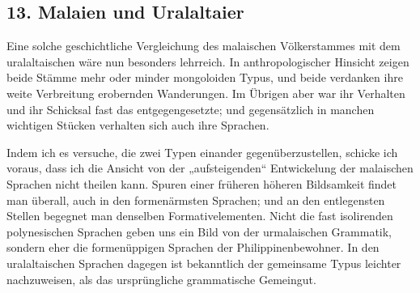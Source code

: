 \subsection*{13. Malaien und {\color{lsLightWine}Uralaltaier}}\label{IV.IV.13}


Eine solche geschichtliche Vergleichung des malaischen Völkerstammes mit dem uralaltaischen wäre nun besonders lehrreich. In anthropologischer Hinsicht zeigen beide Stämme mehr oder minder mongoloiden Typus, und beide verdanken ihre weite Verbreitung erobernden Wanderungen. Im Übrigen aber war ihr Verhalten und ihr Schicksal fast das entgegengesetzte; und gegensätzlich in manchen wichtigen Stücken verhalten sich auch ihre Sprachen.

Indem ich es versuche, die zwei Typen einander gegenüberzustellen, schicke ich voraus, dass ich die Ansicht von der „aufsteigenden“ Entwickelung der malaischen Sprachen nicht theilen kann. Spuren einer früheren höheren Bildsamkeit findet man überall, auch in den formenärmsten Sprachen; und an den entlegensten Stellen begegnet man denselben Formativelementen. Nicht die fast isolirenden polynesischen Sprachen geben uns ein Bild von der urmalaischen Grammatik, sondern eher die formenüppigen Sprachen der Philippinenbewohner. In den ural\label{fp.394}altaischen Sprachen dagegen ist bekanntlich der gemeinsame Typus leichter nachzuweisen, als das ursprüngliche grammatische Gemeingut.

